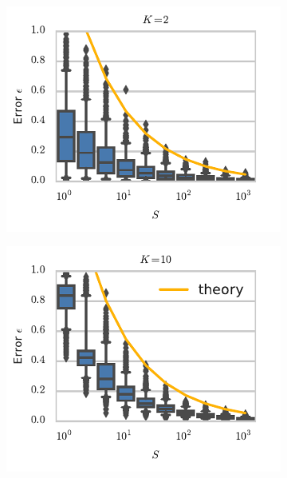\begin{figure}[t!]
  \centering
  \begin{subfigure}[b]{2.75in}
    \centering
    \includegraphics[width=\textwidth]{figures/ch7/error_vs_S_K2}
    \label{fig:error_vs_S_K2}
 \end{subfigure}
 \begin{subfigure}[b]{2.75in}
   \centering
   \includegraphics[width=\textwidth]{figures/ch7/error_vs_S_K10}
   \label{fig:error_vs_S_K10}

\end{subfigure}
\end{figure}
